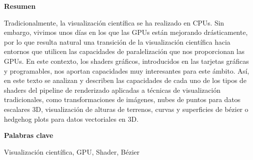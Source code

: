 
\newpage

\thispagestyle{empty}

\begin{center}

{\bf \Huge Resumen}

  \end{center} \vspace{1cm}

    Tradicionalmente, la visualización científica se ha realizado en CPUs. Sin
    embargo, vivimos unos días en los que las GPUs están mejorando
    drásticamente, por lo que resulta natural una transición de la visualización
    científica hacia entornos que utilicen las capacidades de paralelización que
    nos proporcionan las GPUs. En este contexto, los shaders gráficos,
    introducidos en las tarjetas gráficas y programables, nos aportan
    capacidades muy interesantes para este ámbito. Así, en este texto se
    analizan y describen las capacidades de cada uno de los tipos de shaders del
    pipeline de renderizado aplicadas a técnicas de visualización tradicionales,
    como transformaciones de imágenes, nubes de puntos para datos escalares 3D,
    visualización de alturas de terrenos, curvas y superficies de bézier o
    hedgehog plots para datos vectoriales en 3D.

\vspace{1cm}


\begin{center}

{\bf \Large Palabras clave}

   \end{center}

   \vspace{0.5cm}
   
   Visualización científica, GPU, Shader, Bézier
   


